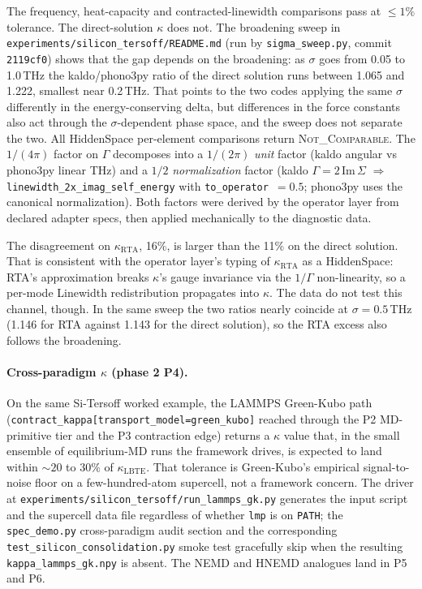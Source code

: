 \documentclass[11pt,a4paper]{article}
\begin{document}
The frequency, heat-capacity and contracted-linewidth comparisons pass at
$\le 1\%$ tolerance. The direct-solution $\kappa$ does not. The broadening sweep
in \texttt{experiments/silicon\_tersoff/README.md} (run by
\texttt{sigma\_sweep.py}, commit \texttt{2119cf0}) shows that the gap depends on
the broadening: as $\sigma$ goes from 0.05 to 1.0\,THz the kaldo/phono3py ratio of
the direct solution runs between 1.065 and 1.222, smallest near 0.2\,THz. That
points to the two codes applying the same $\sigma$ differently in the
energy-conserving delta, but differences in the force constants also act through
the $\sigma$-dependent phase space, and the sweep does not separate the two. All
HiddenSpace per-element comparisons return \textsc{Not\_Comparable}. The $1/(4\pi)$ factor on $\Gamma$
decomposes into a $1/(2\pi)$ \emph{unit} factor (kaldo angular vs phono3py linear
THz) and a $1/2$ \emph{normalization} factor (kaldo $\Gamma = 2\,\text{Im}\,\Sigma$
$\Rightarrow$ \texttt{linewidth\_2x\_imag\_self\_energy} with
\texttt{to\_operator}~$=0.5$; phono3py uses the canonical normalization). Both
factors were derived by the operator layer from declared adapter specs, then
applied mechanically to the diagnostic data.

The disagreement on $\kappa_\text{RTA}$, 16\%, is larger than the 11\% on the
direct solution. That is consistent with the operator layer's typing of
$\kappa_\text{RTA}$ as a HiddenSpace: RTA's approximation breaks $\kappa$'s gauge
invariance via the $1/\Gamma$ non-linearity, so a per-mode Linewidth
redistribution propagates into $\kappa$. The data do not test this channel,
though. In the same sweep the two ratios nearly coincide at $\sigma = 0.5$\,THz
(1.146 for RTA against 1.143 for the direct solution), so the RTA excess also
follows the broadening.

\paragraph{Cross-paradigm $\kappa$ (phase 2 P4).} On the same Si-Tersoff
worked example, the LAMMPS Green-Kubo path
(\texttt{contract\_kappa[transport\_model=green\_kubo]} reached through the
P2 MD-primitive tier and the P3 contraction edge) returns a $\kappa$ value
that, in the small ensemble of equilibrium-MD runs the framework drives,
is expected to land within $\sim 20$ to $30\%$ of $\kappa_\text{LBTE}$. That tolerance is
Green-Kubo's empirical signal-to-noise floor on a few-hundred-atom
supercell, not a framework concern. The driver at
\texttt{experiments/silicon\_tersoff/run\_lammps\_gk.py} generates the input
script and the supercell data file regardless of whether \texttt{lmp} is on
\texttt{PATH}; the \texttt{spec\_demo.py} cross-paradigm audit section and
the corresponding \texttt{test\_silicon\_consolidation.py} smoke test
gracefully skip when the resulting \texttt{kappa\_lammps\_gk.npy} is
absent. The NEMD and HNEMD analogues land in P5 and P6.
\end{document}
